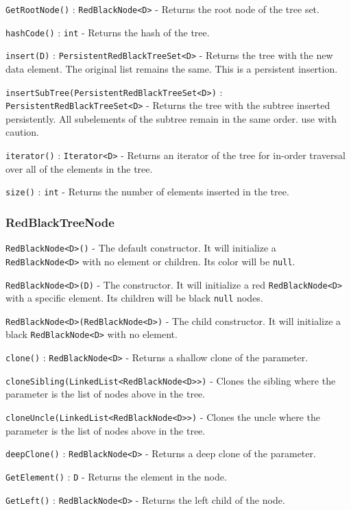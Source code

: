 \documentclass[11pt]{article}
\begin{document}
\texttt{GetRootNode()} : \texttt{RedBlackNode<D>} - Returns the root node of the tree set.

\texttt{hashCode()} : \texttt{int} - Returns the hash of the tree.

\texttt{insert(D)} : \texttt{PersistentRedBlackTreeSet<D>} - Returns the tree with the new data element. The original list remains the same. This is a persistent insertion.

\texttt{insertSubTree(PersistentRedBlackTreeSet<D>)} : \texttt{PersistentRedBlackTreeSet<D>} - Returns the tree with the subtree inserted persistently. All subelements of the subtree remain in the same order. use with caution.

\texttt{iterator()} : \texttt{Iterator<D>} - Returns an iterator of the tree for in-order traversal over all of the elements in the tree.

\texttt{size()} : \texttt{int} - Returns the number of elements inserted in the tree.

\subsubsection{RedBlackTreeNode}
\label{sec:node}

\texttt{RedBlackNode<D>()} - The default constructor. It will initialize a \texttt{RedBlackNode<D>} with no element or children. Its color will be \texttt{null}.

\texttt{RedBlackNode<D>(D)} - The constructor. It will initialize a red \texttt{RedBlackNode<D>} with a specific element. Its children will be black \texttt{null} nodes.

\texttt{RedBlackNode<D>(RedBlackNode<D>)} - The child constructor. It will initialize a black \texttt{RedBlackNode<D>} with no element.

\texttt{clone()} : \texttt{RedBlackNode<D>} - Returns a shallow clone of the parameter.

\texttt{cloneSibling(LinkedList<RedBlackNode<D>>)} - Clones the sibling where the parameter is the list of nodes above in the tree.

\texttt{cloneUncle(LinkedList<RedBlackNode<D>>)}  - Clones the uncle where the parameter is the list of nodes above in the tree.

\texttt{deepClone()} : \texttt{RedBlackNode<D>} - Returns a deep clone of the parameter.

\texttt{GetElement()} : \texttt{D} - Returns the element in the node.

\texttt{GetLeft()}  : \texttt{RedBlackNode<D>} - Returns the left child of the node.
\end{document}
